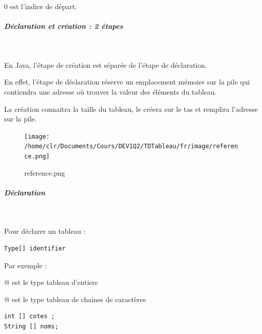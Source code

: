 \documentclass[11pt,a4paper]{article}
\begin{document}
            \par
        0 est l'indice de d\'epart.
            \par
        
			
		\subparagraph{D\'eclaration et cr\'eation : 2 \'etapes} 
		
					\textcolor{white}{.} \par
				
        En Java, l'\'etape de cr\'eation est s\'epar\'ee de l'\'etape de d\'eclaration. \par
				
        En effet, l'\'etape de d\'eclaration r\'eserve un emplacement m\'emoire sur la pile qui contiendra une adresse 
        o\`u trouver la valeur des \'el\'ements du tableau. \par
				
        La cr\'eation connaitra la taille du tableau, le cr\'eera sur le tas et remplira l'adresse sur la pile.
      
            \par
        \begin{figure}[hbt]
				    \begin{center}
					\texttt{[image: /home/clr/Documents/Cours/DEV1Q2/TDTableau/fr/image/reference.png]}
						\end{center}
                
                    \caption[reference.png]{reference.png}
                \end{figure}
                    
            \par
        
			
		\subparagraph{D\'eclaration} 
		
					\textcolor{white}{.} \par
				
        Pour d\'eclarer un tableau : 
      
            \par
        \begin{verbatim}
Type[] identifier
      \end{verbatim}
        Par exemple :\par
				\verb@int []@ est le type tableau d'entiers\par
				\verb@String []@ est le type tableau de chaines de caract\`eres
      
            \par
        \begin{verbatim}
int [] cotes ;
String [] noms;
      \end{verbatim}
			
\end{document}
